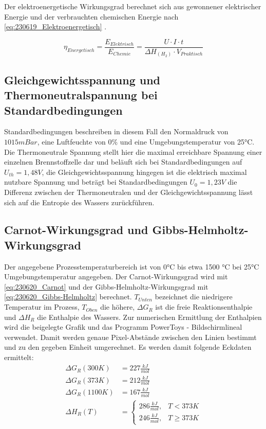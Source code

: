 Der elektroenergetische Wirkungsgrad berechnet sich aus gewonnener elektrischer Energie und der verbrauchten chemischen Energie nach \autoref{eq:230619_Elektroenergetisch} \cite{BZ-Folien}.

\begin{equation}
    \eta_{Energetisch} = \frac{E_{Elektrisch}}{E_{Chemie}} = \frac{U \cdot I \cdot t}{\Delta H_{(H_2)} \cdot V_{Praktisch}}
    \label{eq:230619_Elektroenergetisch}
\end{equation}

\subsection{Gleichgewichtsspannung und Thermoneutralspannung bei Standardbedingungen}

Standardbedingungen beschreiben in diesem Fall den Normaldruck von $1015mBar$, eine Luftfeuchte von $0\%$ und eine Umgebungstemperatur von 25°C.
Die Thermoneutrale Spannung stellt hier die maximal erreichbare Spannung einer einzelnen Brennstoffzelle dar und beläuft sich bei Standardbedingungen auf $U_{th} = 1,48V$, 
die Gleichgewichtsspannung hingegen ist die elektrisch maximal nutzbare Spannung und beträgt bei Standardbedingungen $U_0 = 1,23V$ die Differenz zwischen der Thermoneutralen und der Gleichgewichtsspannung lässt sich auf die Entropie des Wassers zurückführen.   

\subsection{Carnot-Wirkungsgrad und Gibbs-Helmholtz-Wirkungsgrad}

Der angegebene Prozesstemperaturbereich ist von 0°C bis etwa 1500 °C bei 25°C
Umgebungstemperatur angegeben.
Der Carnot-Wirkungsgrad wird mit \autoref{eq:230620_Carnot} und der Gibbs-Helmholtz-Wirkungsgrad mit
   \autoref{eq:230620_Gibbs-Helmholtz} berechnet. 
$T_{Unten}$ bezeichnet die niedrigere Temperatur im Prozess, $T_{Oben}$ die höhere, $\Delta G_R$ ist die freie Reaktionsenthalpie und $\Delta H_R$ die Enthalpie des Wassers.
Zur numerischen Ermittlung der Enthalpien wird die beigelegte Grafik und das Programm PowerToys - Bildschirmlineal verwendet.
Damit werden genaue Pixel-Abstände zwischen den Linien bestimmt und zu den gegeben Einheit umgerechnet.
Es werden damit folgende Eckdaten ermittelt:
\begin{align}
    \Delta G_R(300K) &= 227 \frac{kJ}{mol} \nonumber\\
    \Delta G_R(373K) &= 212 \frac{kJ}{mol} \nonumber\\
    \Delta G_R(1100K) &= 167 \frac{kJ}{mol} \nonumber\\
    \Delta H_R(T) &= 
        \begin{cases}
            286 \frac{kJ}{mol}, & T < 373 K \\
            246 \frac{kJ}{mol}, & T \geq 373 K
        \end{cases} \nonumber
\end{align}

